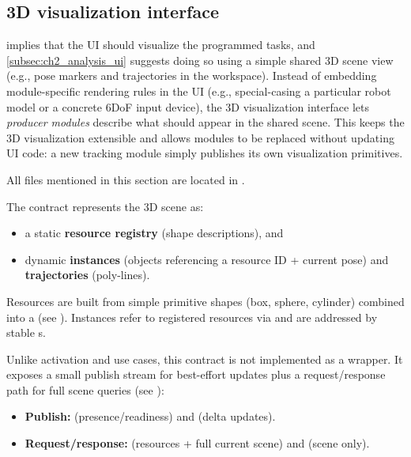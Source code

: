 \subsection{3D visualization interface} \label{sec:ch3_visualization_interface}

 implies that the UI should visualize the programmed tasks, and \autoref{subsec:ch2_analysis_ui} suggests doing so using a simple shared 3D scene view (e.g., pose markers and trajectories in the workspace).
Instead of embedding module-specific rendering rules in the UI (e.g., special-casing a particular robot model or a concrete 6DoF input device), the 3D visualization interface lets \emph{producer modules} describe what should appear in the shared scene. This keeps the 3D visualization extensible and allows modules to be replaced without updating UI code: a new tracking module simply publishes its own visualization primitives.

All files mentioned in this section are located in .


The contract represents the 3D scene as:
\begin{itemize}
    \item a static \textbf{resource registry} (shape descriptions), and
    \item dynamic \textbf{instances} (objects referencing a resource ID + current pose) and \textbf{trajectories} (poly-lines).
\end{itemize}
Resources are built from simple primitive shapes (box, sphere, cylinder) combined into a  (see ). Instances refer to registered resources via  and are addressed by stable s.

Unlike activation and use cases, this contract is not implemented as a wrapper. It exposes a small publish stream for best-effort updates plus a request/response path for full scene queries (see ):
\begin{itemize}
    \item \textbf{Publish:}  (presence/readiness) and  (delta updates).
    \item \textbf{Request/response:}  (resources + full current scene) and  (scene only).
\end{itemize}

